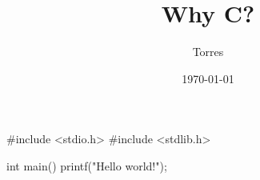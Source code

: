 \documentclass{article}
\title{Why C?}
\author{Torres}
\date{\today}
\begin{document}
\begin{verbatile}
  #include <stdio.h>
  #include <stdlib.h>

  int main() {
    printf("Hello world!");
  }
\end{verbatile}
\end{document}
